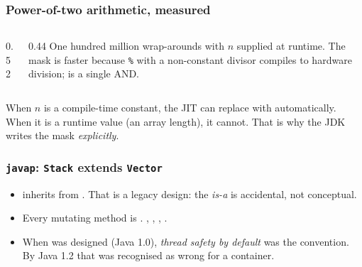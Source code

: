 \documentclass[aspectratio=169,10pt,compress]{beamer}
\begin{document}
\begin{frame}[t,fragile] \frametitle{Power-of-two arithmetic, measured}
  \begin{columns}[T]
    \begin{column}{0.52\textwidth}
    \end{column}
    \begin{column}{0.44\textwidth}
      \small
      One hundred million wrap-arounds with $n$ supplied at runtime.
       The mask is faster because
      \texttt{\%} with a non-constant divisor compiles to hardware
      division; \hCode{\&} is a single AND.
    \end{column}
  \end{columns}
  \vspace{0.3em}
  \small
  When $n$ is a compile-time constant, the JIT can replace
   with  automatically. When it is a
  runtime value (an array length), it cannot. That is why the JDK
  writes the mask \emph{explicitly}.
\end{frame}





\begin{frame}[t,fragile] \frametitle{\texttt{javap}: \texttt{Stack} extends \texttt{Vector}}
  \begin{itemize}\small
    \item {} inherits from .
          That is a legacy design: the \emph{is-a} is accidental,
          not conceptual.
    \item Every mutating method is .
          , , , .
    \item When  was designed (Java 1.0), \emph{thread safety by default}
          was the convention. By Java 1.2 that was recognised as wrong
          for a container.
  \end{itemize}
\end{frame}
\end{document}
